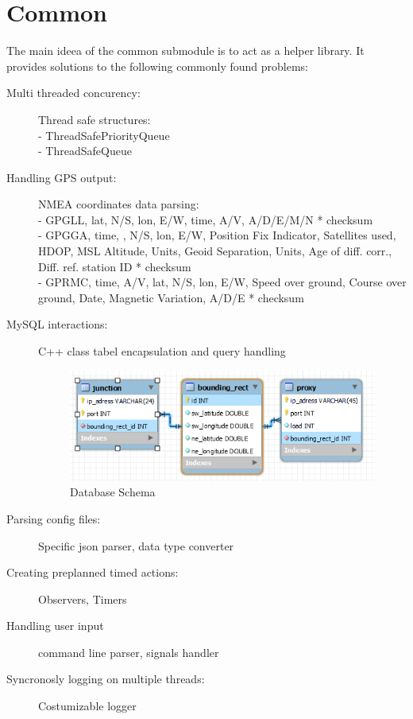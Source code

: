 \documentclass[17pt]{report}
\begin{document}
\section{Common}
\indent \indent
The main ideea of the common submodule is to act as a helper library. It provides 
solutions to the following commonly found problems:
\begin{description}
    \item[Multi threaded concurency:] Thread safe structures:\\
    - ThreadSafePriorityQueue\\
    - ThreadSafeQueue
    \item[Handling GPS output:] NMEA coordinates data parsing: \\
    - GPGLL, lat, N/S, lon, E/W, time, A/V, A/D/E/M/N * checksum\\
    - GPGGA, time, , N/S, lon, E/W, Position Fix Indicator, Satellites used, HDOP, MSL Altitude, Units, 
	Geoid Separation, Units, Age of diff. corr., Diff. ref. station ID * checksum\\
    - GPRMC, time, A/V, lat, N/S, lon, E/W, Speed over ground,
    Course over ground, Date, Magnetic Variation, A/D/E * checksum
    \item[MySQL interactions:] C++ class tabel encapsulation and query handling
    \begin{figure}[h!]
        \includegraphics[width=\textwidth]{DB/DbSchema.png}
        \caption{Database Schema}
        \label{fig:Database Schema}
    \end{figure}
    \item[Parsing config files:] Specific json parser, data type converter
    \item[Creating preplanned timed actions:] Observers, Timers 
    \item[Handling user input] command line parser, signals handler
    \item[Syncronosly logging on multiple threads:] Costumizable logger
\end{description}
\end{document}
